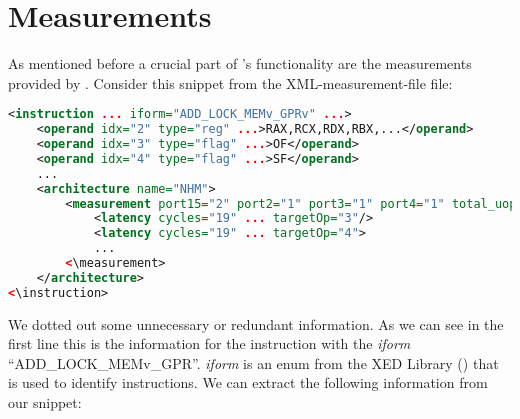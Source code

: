  
 

\section{Measurements}
\label{sec:measurements}

As mentioned before a crucial part of \suaca's functionality are the measurements provided by \cite{Andreas}. Consider this snippet from the XML-measurement-file file:


\begin{lstlisting}[language=XML, basicstyle=\ttfamily\scriptsize, breaklines=false]
<instruction ... iform="ADD_LOCK_MEMv_GPRv" ...>
    <operand idx="2" type="reg" ...>RAX,RCX,RDX,RBX,...</operand>
    <operand idx="3" type="flag" ...>OF</operand>
    <operand idx="4" type="flag" ...>SF</operand>
    ...
    <architecture name="NHM">
        <measurement port15="2" port2="1" port3="1" port4="1" total_uops="5">
            <latency cycles="19" ... targetOp="3"/>
            <latency cycles="19" ... targetOp="4">
            ...
        <\measurement>
    </architecture>
<\instruction>
\end{lstlisting}

We dotted out some unnecessary or redundant information. As we can see in the first line this is the information for the instruction with the \emph{iform} ``ADD\_LOCK\_MEMv\_GPR''. \emph{iform} is an enum from the XED Library (\cite{xed}) that is used to identify instructions. We can extract the following information from our snippet:

